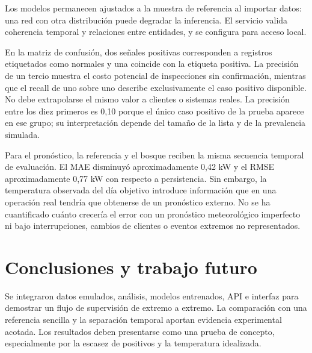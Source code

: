 \documentclass[conference]{IEEEtran}
\begin{document}
Los modelos permanecen ajustados a la muestra de referencia al importar datos: una red con otra distribución puede degradar la inferencia. El servicio valida coherencia temporal y relaciones entre entidades, y se configura para acceso local.

En la matriz de confusión, dos señales positivas corresponden a registros etiquetados como normales y una coincide con la etiqueta positiva. La precisión de un tercio muestra el costo potencial de inspecciones sin confirmación, mientras que el recall de uno sobre uno describe exclusivamente el caso positivo disponible. No debe extrapolarse el mismo valor a clientes o sistemas reales. La precisión entre los diez primeros es 0,10 porque el único caso positivo de la prueba aparece en ese grupo; su interpretación depende del tamaño de la lista y de la prevalencia simulada.

Para el pronóstico, la referencia y el bosque reciben la misma secuencia temporal de evaluación. El MAE disminuyó aproximadamente 0,42 kW y el RMSE aproximadamente 0,77 kW con respecto a persistencia. Sin embargo, la temperatura observada del día objetivo introduce información que en una operación real tendría que obtenerse de un pronóstico externo. No se ha cuantificado cuánto crecería el error con un pronóstico meteorológico imperfecto ni bajo interrupciones, cambios de clientes o eventos extremos no representados.
\section{Conclusiones y trabajo futuro}
Se integraron datos emulados, análisis, modelos entrenados, API e interfaz para demostrar un flujo de supervisión de extremo a extremo. La comparación con una referencia sencilla y la separación temporal aportan evidencia experimental acotada. Los resultados deben presentarse como una prueba de concepto, especialmente por la escasez de positivos y la temperatura idealizada.
\end{document}
